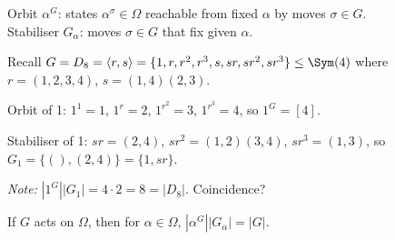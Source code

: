 \begin{slide}
    Orbit $\alpha^G$: states $\alpha^\sigma \in \Omega$ reachable from fixed $\alpha$ by moves $\sigma \in G$. \\
    Stabiliser $G_\alpha$: moves $\sigma \in G$ that fix given $\alpha$.

    \begin{example}
        \vspace{0pt}
        Recall $G = D_8 = \langle r,s \rangle = \{1,r,r^2,r^3,s,sr,sr^2,sr^3\} \leq \Sym(4)$ where $r = (1,2,3,4)$, $s = (1,4)(2,3)$.

        Orbit of 1: $1^1 = 1$, $1^r = 2$, $1^{r^2} = 3$, $1^{r^3} = 4$, so $1^G = [4]$.

        Stabiliser of 1: $sr = (2,4)$, $sr^2 = (1,2)(3,4)$, $sr^3 = (1,3)$, so $G_1 = \{(),(2,4)\} = \{1,sr\}$.

        \textit{Note:} $|1^G||G_1| = 4 \cdot 2 = 8 = |D_8|$. Coincidence?
    \end{example}

    \begin{theorem}
        \vspace{0pt}
        If $G$ acts on $\Omega$, then for $\alpha \in \Omega$, $|\alpha^G||G_\alpha| = |G|$.
    \end{theorem}
\end{slide}